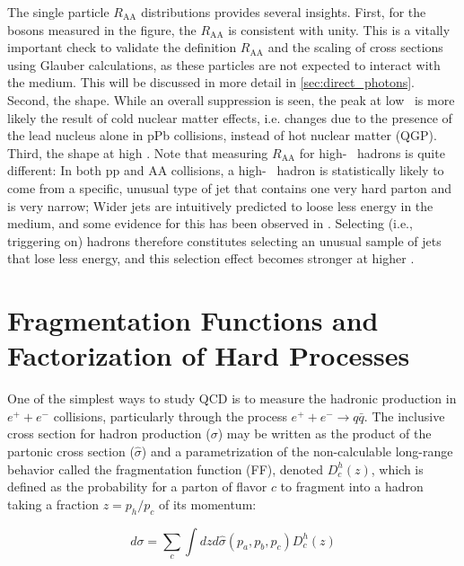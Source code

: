   The single particle $R_\mathrm{AA}$ distributions provides several insights. First, for the bosons measured in the figure, the $R_\mathrm{AA}$ is consistent with unity. This is a vitally important check to validate the definition $R_\mathrm{AA}$ and the scaling of cross sections using Glauber calculations, as these particles are not expected to interact with the medium. This will be discussed in more detail in \ref{sec:direct_photons}. Second, the shape. While an overall suppression is seen, the peak at low \pt~is more likely the result of cold nuclear matter effects, i.e. changes due to the presence of the lead nucleus alone in pPb collisions, instead of hot nuclear matter (QGP). Third, the shape at high \pT. Note that measuring $R_\mathrm{AA}$ for high-\pT~ hadrons is quite different: In both pp and AA collisions, a high-\pT~ hadron is statistically likely to come from a specific, unusual type of jet that contains one very hard parton and is very narrow; Wider jets are intuitively predicted to loose less energy in the medium, and some evidence for this has been observed in \cite{Khachatryan2016}. Selecting (i.e., triggering on) hadrons therefore constitutes selecting an unusual sample of jets that lose less energy, and this selection effect becomes stronger at higher \pT.


\section{Fragmentation Functions and Factorization of Hard Processes}
\label{sec:FF}
One of the simplest ways to study QCD is to measure the hadronic production in $e^+ + e^-$ collisions, particularly through the process  $e^+ + e^- \rightarrow q\bar{q}$. The inclusive cross section for hadron production ($\sigma$) may be written as the product of the partonic cross section ($\hat{\sigma}$) and a parametrization of the non-calculable long-range behavior called the fragmentation function (FF), denoted $D_c^h(z)$, which is defined as the probability for a parton of flavor $c$ to fragment into a hadron taking a fraction $z=p_h/p_c$ of its momentum:

  \begin{equation}
    d\sigma = \sum_c\int dz d\hat{\sigma}(p_a,p_b,p_c)D_c^h(z)
    \label{eq:hadron_cross_section}
  \end{equation}

